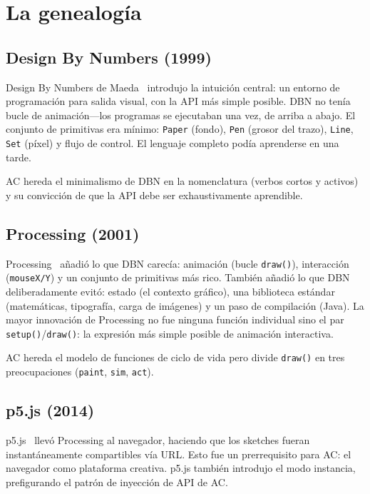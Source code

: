 \documentclass[10pt,letterpaper,twocolumn]{article}
\begin{document}

\section{La genealogía}
\label{sec:genealogy}

\subsection{Design By Numbers (1999)}

Design By Numbers de Maeda~\citep{maeda2001dbn} introdujo la intuición central: un entorno de programación para salida visual, con la API más simple posible. DBN no tenía bucle de animación---los programas se ejecutaban una vez, de arriba a abajo. El conjunto de primitivas era mínimo: \texttt{Paper} (fondo), \texttt{Pen} (grosor del trazo), \texttt{Line}, \texttt{Set} (píxel) y flujo de control. El lenguaje completo podía aprenderse en una tarde.

AC hereda el minimalismo de DBN en la nomenclatura (verbos cortos y activos) y su convicción de que la API debe ser exhaustivamente aprendible.

\subsection{Processing (2001)}

Processing~\citep{reas2003processing} añadió lo que DBN carecía: animación (bucle \texttt{draw()}), interacción (\texttt{mouseX/Y}) y un conjunto de primitivas más rico. También añadió lo que DBN deliberadamente evitó: estado (el contexto gráfico), una biblioteca estándar (matemáticas, tipografía, carga de imágenes) y un paso de compilación (Java). La mayor innovación de Processing no fue ninguna función individual sino el par \texttt{setup()}/\texttt{draw()}: la expresión más simple posible de animación interactiva.

AC hereda el modelo de funciones de ciclo de vida pero divide \texttt{draw()} en tres preocupaciones (\texttt{paint}, \texttt{sim}, \texttt{act}).

\subsection{p5.js (2014)}

p5.js~\citep{mccarthy2015p5js} llevó Processing al navegador, haciendo que los sketches fueran instantáneamente compartibles vía URL. Esto fue un prerrequisito para AC: el navegador como plataforma creativa. p5.js también introdujo el modo instancia, prefigurando el patrón de inyección de API de AC.
\end{document}
